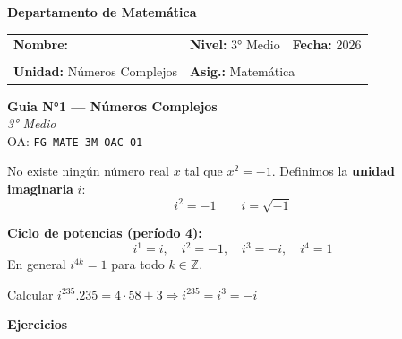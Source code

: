 \documentclass[11pt,a4paper]{article}
\begin{document}
\begin{center}\large\textbf{Departamento de Matemática}\end{center}
\vspace{-2mm}
\begin{center}
\begin{tabular}{|p{7cm}|p{5cm}|p{3cm}|}
\hline
\textbf{Nombre:} & \textbf{Nivel:} 3° Medio & \textbf{Fecha:} 2026 \\\\
\hline
\textbf{Unidad:} Números Complejos & \multicolumn{2}{l|}{\textbf{Asig.:} Matemática} \\
\hline
\end{tabular}
\end{center}
\vspace{2mm}
\begin{center}\textbf{\Large Guia N°1 --- Números Complejos}\\\normalsize\textit{3° Medio}\\\small OA: \texttt{FG-MATE-3M-OAC-01}\end{center}
\vspace{2mm}
\begin{cajat}
No existe ningún número real $x$ tal que $x^2 = -1$. Definimos la \textbf{unidad imaginaria} $i$:
\[ i^2 = -1 \qquad i = \sqrt{-1} \]

\textbf{Ciclo de potencias (período 4):}
\[ i^1=i,\quad i^2=-1,\quad i^3=-i,\quad i^4=1 \]
En general $i^{4k}=1$ para todo $k\in\mathbb{Z}$.
\end{cajat}

\begin{cajae}
Calcular $i^{235}$.\newline $235 = 4\cdot 58 + 3 \Rightarrow i^{235} = i^3 = -i$
\end{cajae}

\textbf{Ejercicios}
\end{document}
